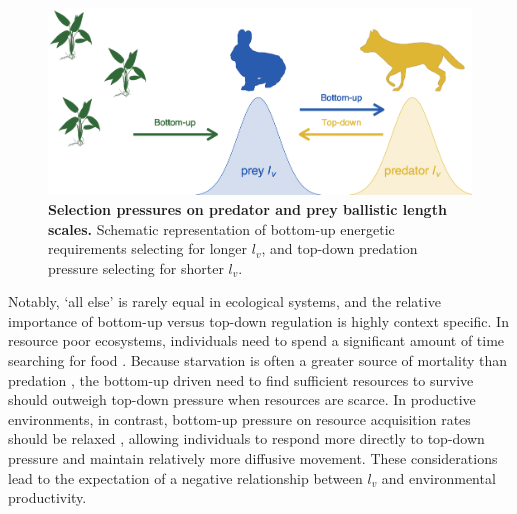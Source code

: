 \documentclass[12pt]{article}
\begin{document}
\begin{figure}[!h]
\centering
\includegraphics[scale=1]{Diagram_V2.png}
\caption{\textbf{Selection pressures on predator and prey ballistic length scales.} Schematic representation of bottom-up energetic requirements selecting for longer $l_v$, and top-down predation pressure selecting for shorter $l_v$.}
\label{fig:theory}
\end{figure}

Notably, `all else' is rarely equal in ecological systems, and the relative importance of bottom-up versus top-down regulation is highly context specific. In resource poor ecosystems, individuals need to spend a significant amount of time searching for food \cite{White:1978,Viswanathan:1999,Paiva:2010}. Because starvation is often a greater source of mortality than predation \cite{Mduma:1999}, the bottom-up driven need to find sufficient resources to survive should outweigh top-down pressure when resources are scarce. In productive environments, in contrast, bottom-up pressure on resource acquisition rates should be relaxed \cite{Charnov:1976wz,Viswanathan:1999,Dickie:2022}, allowing individuals to respond more directly to top-down pressure and maintain relatively more diffusive movement. These considerations lead to the expectation of a negative relationship between $l_v$ and environmental productivity.
\end{document}
